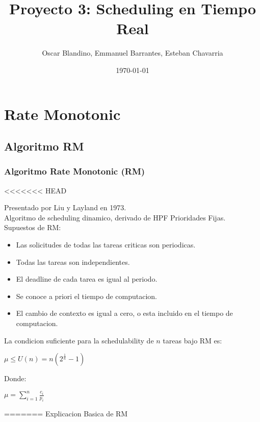 \documentclass[xcolor=table]{beamer}
\title[Proyecto 3]{Proyecto 3: Scheduling en Tiempo Real} %
\author{Oscar Blandino, Emmanuel Barrantes, Esteban Chavarria} %
\institute[TEC] %
{
Tecnologico de Costa Rica \\ %
Sistemas Operativos Avanzados \\
I Semestre - 2018
\medskip
\textit{} %
}
\date{\today} %
\begin{document}
\begin{frame}
\titlepage %
\end{frame}



\section{Rate Monotonic}

\subsection{Algoritmo RM}

\begin{frame} 
\frametitle{Algoritmo Rate Monotonic (RM)} 
<<<<<<< HEAD

Presentado por Liu y Layland en 1973. \\
Algoritmo de scheduling dinamico, derivado de HPF Prioridades Fijas. \\
Supuestos de RM:
\begin{itemize}
\item Las solicitudes de todas las tareas criticas son periodicas.
\item Todas las tareas son independientes.
\item El deadline de cada tarea es igual al periodo.
\item Se conoce a priori el tiempo de computacion.
\item El cambio de contexto es igual a cero, o esta incluido en el tiempo de computacion.
\end{itemize} 

La condicion suficiente para la schedulability de $n$ tareas bajo RM es:
\begin{center}
$\mu \leq U(n) = n(2^{\frac{1}{n}}-1)$
\end{center}

Donde:
\begin{center}
$\mu = \sum_{i=1}^{n}\frac{c_i}{p_i}$
\end{center}

=======
Explicacion Basica de RM \\
\end{frame}
\end{document}
